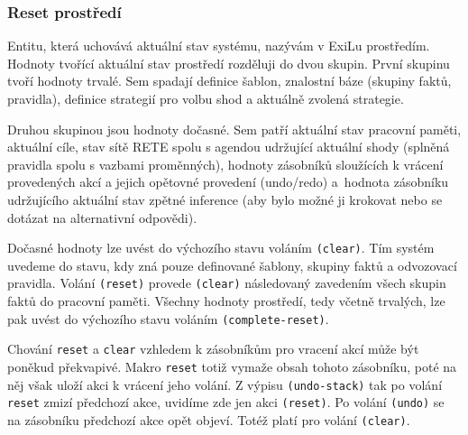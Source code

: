 \subsubsection{Reset prostředí}
\label{env cleanup}

Entitu, která uchovává aktuální stav systému, nazývám v ExiLu prostředím.
Hodnoty tvořící aktuální stav prostředí rozděluji do dvou skupin. První skupinu
tvoří hodnoty trvalé. Sem spadají definice šablon, znalostní báze (skupiny
faktů, pravidla), definice strategií pro volbu shod a aktuálně zvolená
strategie.

Druhou skupinou jsou hodnoty dočasné. Sem patří aktuální stav pracovní paměti,
aktuální cíle, stav sítě RETE spolu s agendou udržující aktuální shody (splněná
pravidla spolu s vazbami proměnných), hodnoty zásobníků sloužících k vrácení
provedených akcí a jejich opětovné provedení (undo/redo) a~hodnota zásobníku
udržujícího aktuální stav zpětné inference (aby bylo možné ji krokovat nebo se
dotázat na alternativní odpovědi).

Dočasné hodnoty lze uvést do výchozího stavu voláním \verb|(clear)|. Tím systém
uvedeme do stavu, kdy zná pouze definované šablony, skupiny faktů a odvozovací
pravidla. Volání \verb|(reset)| provede \verb|(clear)| následovaný zavedením
všech skupin faktů do pracovní paměti. Všechny hodnoty prostředí, tedy včetně
trvalých, lze pak uvést do výchozího stavu voláním \verb|(complete-reset)|.

Chování \verb|reset| a \verb|clear| vzhledem k zásobníkům pro vracení akcí
může být poněkud překvapivé. Makro \verb|reset| totiž vymaže obsah tohoto
zásobníku, poté na něj však uloží akci k vrácení jeho volání. Z výpisu
\verb|(undo-stack)| tak po volání \verb|reset| zmizí předchozí akce, uvidíme zde
jen akci \verb|(reset)|. Po volání \verb|(undo)| se na zásobníku předchozí akce
opět objeví. Totéž platí pro volání \verb|(clear)|.
